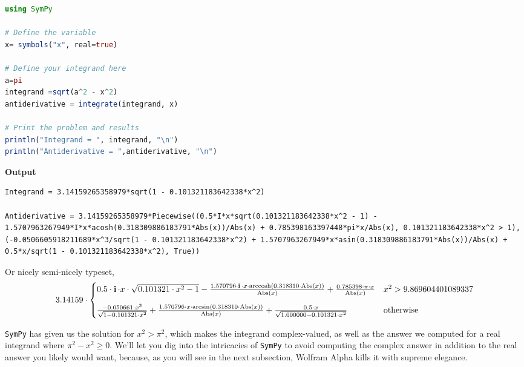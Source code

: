 \begin{lstlisting}[language=Julia,style=mystyle]
using SymPy

# Define the variable
x= symbols("x", real=true)

# Define your integrand here
a=pi
integrand =sqrt(a^2 - x^2)
antiderivative = integrate(integrand, x)

# Print the problem and results
println("Integrand = ", integrand, "\n")
println("Antiderivative = ",antiderivative, "\n")
\end{lstlisting}
\textbf{Output} 
\begin{verbatim}
Integrand = 3.14159265358979*sqrt(1 - 0.101321183642338*x^2)

Antiderivative = 3.14159265358979*Piecewise((0.5*I*x*sqrt(0.101321183642338*x^2 - 1) - 1.5707963267949*I*x*acosh(0.318309886183791*Abs(x))/Abs(x) + 0.785398163397448*pi*x/Abs(x), 0.101321183642338*x^2 > 1), (-0.0506605918211689*x^3/sqrt(1 - 0.101321183642338*x^2) + 1.5707963267949*x*asin(0.318309886183791*Abs(x))/Abs(x) + 0.5*x/sqrt(1 - 0.101321183642338*x^2), True))

\end{verbatim}
Or nicely semi-nicely typeset,
$$3.14159 \cdot \begin{cases} 0.5 \cdot \mathop{\bm{\mathrm i}} \cdot x \cdot \sqrt{0.101321 \cdot x^{2} -1} - \frac{1.570796 \cdot \mathop{\bm{\mathrm i}} \cdot x \cdot \mathrm{arccosh}\left( 0.318310 \cdot \mathrm{Abs}\left( x \right) \right)}{\mathrm{Abs}\left( x \right)} + \frac{0.785398 \cdot \pi \cdot x}{\mathrm{Abs}\left( x \right)}& x^{2} > 9.869604401089337 \\[1em]
\frac{-0.050661 \cdot x^{3}}{\sqrt{1 - 0.101321 \cdot x^{2}}} + \frac{1.570796 \cdot x \cdot \arcsin\left( 0.318310 \cdot \mathrm{Abs}\left( x \right) \right)}{\mathrm{Abs}\left( x \right)} + \frac{0.5 \cdot x}{\sqrt{1.000000 - 0.101321 \cdot x^{2}}}& \text{otherwise} \end{cases}$$

\texttt{SymPy} has given us the solution for $x^2 > \pi^2$, which makes the integrand complex-valued, as well as the answer we computed for a real integrand where $\pi^2 -x^2 \ge 0$. We'll let you dig into the intricacies of \texttt{SymPy} to avoid computing the complex answer in addition to the real answer you likely would want, because, as you will see in the next subsection, Wolfram Alpha kills it with supreme elegance.


